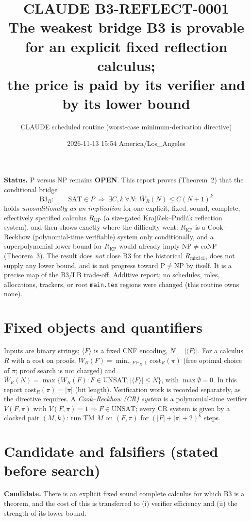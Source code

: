 \documentclass[11pt]{article}
\title{CLAUDE B3-REFLECT-0001\\[2pt]
\large The weakest bridge B3 is provable for an explicit fixed reflection calculus;\\
the price is paid by its verifier and by its lower bound}
\author{CLAUDE scheduled routine (worst-case minimum-derivation directive)}
\date{2026-11-13 15:54 America/Los\_Angeles}
\theoremstyle{definition}
\theoremstyle{remark}
\newcommand{\SAT}{\mathrm{SAT}}
\newcommand{\UNSAT}{\mathrm{UNSAT}}
\newcommand{\NP}{\mathrm{NP}}
\newcommand{\coNP}{\mathrm{coNP}}
\newcommand{\Wb}{\overline W}
\newcommand{\RKP}{R_{\mathrm{KP}}}
\begin{document}
\maketitle

\noindent\textbf{Status.} P versus NP remains \textbf{OPEN}. This report proves (Theorem~2) that the
conditional bridge
\[
\text{B3}_R:\qquad \SAT\in P\ \Longrightarrow\ \exists C,k\ \forall N:\ \Wb_R(N)\le C(N+1)^k
\]
holds \emph{unconditionally as an implication} for one explicit, fixed, sound, complete, effectively
specified calculus $\RKP$ (a size-gated Krajíček--Pudlák reflection system), and then shows exactly where
the difficulty went: $\RKP$ is a Cook--Reckhow (polynomial-time verifiable) system only conditionally, and
a superpolynomial lower bound for $\RKP$ would already imply $\NP\ne\coNP$ (Theorem~3). The result does
\emph{not} close B3 for the historical $R_{\mathrm{mix341}}$, does not supply any lower bound, and is not
progress toward P$\ne$NP by itself. It is a precise map of the B3/LB trade-off. Additive report; no schedules,
roles, allocations, trackers, or root \texttt{main.tex} regions were changed (this routine owns none).

\section*{Fixed objects and quantifiers}
Inputs are binary strings; $\langle F\rangle$ is a fixed CNF encoding, $N=|\langle F\rangle|$. For a calculus
$R$ with a cost on proofs, $W_R(F)=\min_{\pi:F\vdash_R\bot}\mathrm{cost}_R(\pi)$ (free optimal choice of
$\pi$; proof search is not charged) and $\Wb_R(N)=\max\{W_R(F): F\in\UNSAT, |\langle F\rangle|\le N\}$,
with $\max\emptyset=0$. In this report $\mathrm{cost}_R(\pi)=|\pi|$ (bit length). Verification work is
recorded separately, as the directive requires. A \emph{Cook--Reckhow (CR) system} is a polynomial-time
verifier $V(F,\pi)$ with $V(F,\pi)=1\Rightarrow F\in\UNSAT$; every CR system is given by a clocked pair
$(M,k)$: run TM $M$ on $(F,\pi)$ for $(|F|+|\pi|+2)^k$ steps.

\section{Candidate and falsifiers (stated before search)}
\textbf{Candidate.} There is an explicit fixed sound complete calculus for which B3 is a theorem, and the
cost of this is transferred to (i) verifier efficiency and (ii) the strength of its lower bound.
\end{document}
